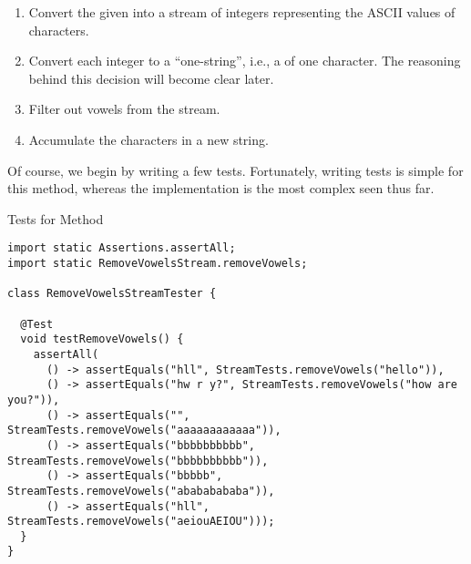 \begin{enumerate}
    \item Convert the given  into a stream of integers representing the ASCII values of characters.
    \item Convert each integer to a ``one-string'', i.e., a  of one character. The reasoning behind this decision will become clear later.
    \item Filter out vowels from the stream.
    \item Accumulate the characters in a new string.
\end{enumerate}

Of course, we begin by writing a few tests. Fortunately, writing tests is simple for this method, whereas the implementation is the most complex seen thus far.

\begin{cl}[]{Tests for  Method}
\begin{lstlisting}[language=MyJava]
import static Assertions.assertAll;
import static RemoveVowelsStream.removeVowels;

class RemoveVowelsStreamTester {
  
  @Test
  void testRemoveVowels() {
    assertAll(
      () -> assertEquals("hll", StreamTests.removeVowels("hello")),
      () -> assertEquals("hw r y?", StreamTests.removeVowels("how are you?")),
      () -> assertEquals("", StreamTests.removeVowels("aaaaaaaaaaaa")),
      () -> assertEquals("bbbbbbbbbb", StreamTests.removeVowels("bbbbbbbbbb")),
      () -> assertEquals("bbbbb", StreamTests.removeVowels("abababababa")),
      () -> assertEquals("hll", StreamTests.removeVowels("aeiouAEIOU")));
  }
}
\end{lstlisting}
\end{cl}


